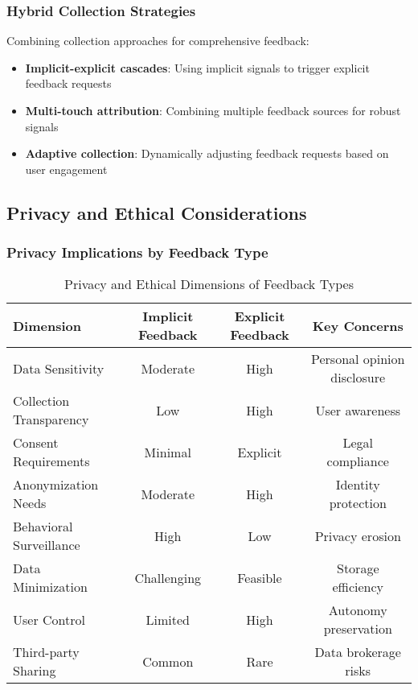 \subsubsection{Hybrid Collection Strategies}

Combining collection approaches for comprehensive feedback:
\begin{itemize}
    \item \textbf{Implicit-explicit cascades}: Using implicit signals to trigger explicit feedback requests
    \item \textbf{Multi-touch attribution}: Combining multiple feedback sources for robust signals
    \item \textbf{Adaptive collection}: Dynamically adjusting feedback requests based on user engagement
\end{itemize}

\subsection{Privacy and Ethical Considerations}

\subsubsection{Privacy Implications by Feedback Type}

\begin{table}[h]
\centering
\caption{Privacy and Ethical Dimensions of Feedback Types}
\label{tab:privacy_ethics}
\begin{tabular}{@{}lccc@{}}
\toprule
Dimension & Implicit Feedback & Explicit Feedback & Key Concerns \\
\midrule
Data Sensitivity & Moderate & High & Personal opinion disclosure \\
Collection Transparency & Low & High & User awareness \\
Consent Requirements & Minimal & Explicit & Legal compliance \\
Anonymization Needs & Moderate & High & Identity protection \\
Behavioral Surveillance & High & Low & Privacy erosion \\
Data Minimization & Challenging & Feasible & Storage efficiency \\
User Control & Limited & High & Autonomy preservation \\
Third-party Sharing & Common & Rare & Data brokerage risks \\
\bottomrule
\end{tabular}
\end{table}

